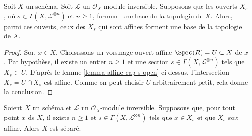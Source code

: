 \begin{lemma}
\label{lemma-affine-s-opens}
Soit $X$ un schéma. Soit $\mathcal{L}$ un $\mathcal{O}_X$-module
inversible. Supposons que les ouverts $X_s$, où $s \in \Gamma(X, \mathcal{L}^{\otimes n})$
et $n \geq 1$, forment une base de la topologie de $X$.
Alors, parmi ces ouverts, ceux des $X_s$ qui sont affines
forment une base de la topologie de $X$.
\end{lemma}

\begin{proof}
Soit $x \in X$. Choisissons un voisinage ouvert affine
$\Spec(R) = U \subset X$ de $x$.
Par hypothèse, il existe un
entier $n \geq 1$ et une section $s \in \Gamma(X, \mathcal{L}^{\otimes n})$
tels que $X_s \subset U$. D'après le lemme \ref{lemma-affine-cap-s-open} ci-dessus,
l'intersection $X_s = U \cap X_s$ est affine. Comme on
peut choisir $U$ arbitrairement petit, cela donne la conclusion.
\end{proof}

\begin{lemma}
\label{lemma-affine-s-opens-cover-quasi-separated}
Soient $X$ un schéma et $\mathcal{L}$ un $\mathcal{O}_X$-module
inversible. Supposons que, pour tout point $x$ de $X$, il existe $n \geq 1$ et
$s \in \Gamma(X, \mathcal{L}^{\otimes n})$ tels que
$x \in X_s$ et que $X_s$ soit affine. Alors $X$ est séparé.
\end{lemma}

